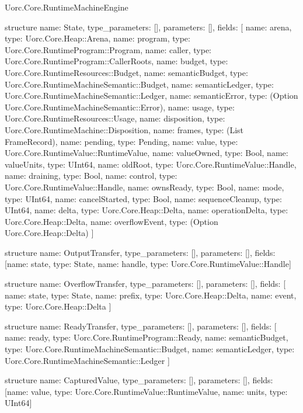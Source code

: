 \begin{lexlean}{Uorc.Core.RuntimeMachineEngine}
\begin{semanticmodule}
structure{
  name: State,
  type_parameters: [],
  parameters: [],
  fields: [
    {name: arena, type: Uorc.Core.Heap::Arena},
    {name: program, type: Uorc.Core.RuntimeProgram::Program},
    {name: caller, type: Uorc.Core.RuntimeProgram::CallerRoots},
    {name: budget, type: Uorc.Core.RuntimeResources::Budget},
    {name: semanticBudget, type: Uorc.Core.RuntimeMachineSemantic::Budget},
    {name: semanticLedger, type: Uorc.Core.RuntimeMachineSemantic::Ledger},
    {name: semanticError, type: (Option Uorc.Core.RuntimeMachineSemantic::Error)},
    {name: usage, type: Uorc.Core.RuntimeResources::Usage},
    {name: disposition, type: Uorc.Core.RuntimeMachine::Disposition},
    {name: frames, type: (List FrameRecord)},
    {name: pending, type: Pending},
    {name: value, type: Uorc.Core.RuntimeValue::RuntimeValue},
    {name: valueOwned, type: Bool},
    {name: valueUnits, type: UInt64},
    {name: oldRoot, type: Uorc.Core.RuntimeValue::Handle},
    {name: draining, type: Bool},
    {name: control, type: Uorc.Core.RuntimeValue::Handle},
    {name: ownsReady, type: Bool},
    {name: mode, type: UInt64},
    {name: cancelStarted, type: Bool},
    {name: sequenceCleanup, type: UInt64},
    {name: delta, type: Uorc.Core.Heap::Delta},
    {name: operationDelta, type: Uorc.Core.Heap::Delta},
    {name: overflowEvent, type: (Option Uorc.Core.Heap::Delta)}
  ]
}

structure{
  name: OutputTransfer,
  type_parameters: [],
  parameters: [],
  fields: [{name: state, type: State}, {name: handle, type: Uorc.Core.RuntimeValue::Handle}]
}

structure{
  name: OverflowTransfer,
  type_parameters: [],
  parameters: [],
  fields: [
    {name: state, type: State},
    {name: prefix, type: Uorc.Core.Heap::Delta},
    {name: event, type: Uorc.Core.Heap::Delta}
  ]
}

structure{
  name: ReadyTransfer,
  type_parameters: [],
  parameters: [],
  fields: [
    {name: ready, type: Uorc.Core.RuntimeProgram::Ready},
    {name: semanticBudget, type: Uorc.Core.RuntimeMachineSemantic::Budget},
    {name: semanticLedger, type: Uorc.Core.RuntimeMachineSemantic::Ledger}
  ]
}

structure{
  name: CapturedValue,
  type_parameters: [],
  parameters: [],
  fields: [{name: value, type: Uorc.Core.RuntimeValue::RuntimeValue}, {name: units, type: UInt64}]
}


\end{semanticmodule}
\end{lexlean}
